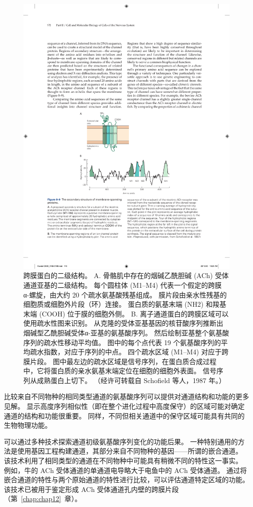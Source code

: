 \begin{figure}[htbp]
	\centering
	\includegraphics[width=0.6\linewidth]{chap08/fig_8_9}
	\caption{跨膜蛋白的二级结构。 A. 骨骼肌中存在的烟碱乙酰胆碱 (ACh) 受体通道亚基的二级结构。 每个圆柱体 (M1–M4) 代表一个假定的跨膜 α-螺旋，由大约 20 个疏水氨基酸残基组成。 膜片段由亲水性残基的细胞质或细胞外片段（环）连接。 蛋白质的氨基末端 (NH2) 和羧基末端 (COOH) 位于膜的细胞外侧。 B. 离子通道蛋白的跨膜区域可以使用疏水性图来识别。 从克隆的受体亚基基因的核苷酸序列推断出烟碱型乙酰胆碱受体α-亚基的氨基酸序列。 然后绘制亚基整个氨基酸序列的疏水性移动平均值。 图中的每个点代表 19 个氨基酸序列的平均疏水指数，对应于序列的中点。 四个疏水区域 (M1–M4) 对应于跨膜片段。 图中最左边的疏水区域是信号序列，在蛋白质合成过程中，它将蛋白质的亲水氨基末端定位在细胞的细胞外表面。 信号序列从成熟蛋白上切下。 （经许可转载自 Schofield 等人，1987 年。）}
	\label{fig:8_9}
\end{figure}


比较来自不同物种的相同类型通道的氨基酸序列可以提供对通道结构和功能的更多见解。
显示高度序列相似性（即在整个进化过程中高度保守）的区域可能对确定通道的结构和功能很重要。
同样，不同但相关通道中的保守区域可能具有共同的生物物理功能。


可以通过多种技术探索通道初级氨基酸序列变化的功能后果。
一种特别通用的方法是使用基因工程构建通道，其部分来自不同物种的基因——所谓的嵌合通道。
该技术利用了相同类型的通道在不同物种中可能具有稍微不同的特性这一事实。
例如，牛的 ACh 受体通道的单通道电导略大于电鱼中的 ACh 受体通道。
通过将嵌合通道的特性与两个原始通道的特性进行比较，可以评估通道特定区域的功能。
该技术已被用于鉴定形成 ACh 受体通道孔内壁的跨膜片段（第~\ref{chap:chap12}~章）。


